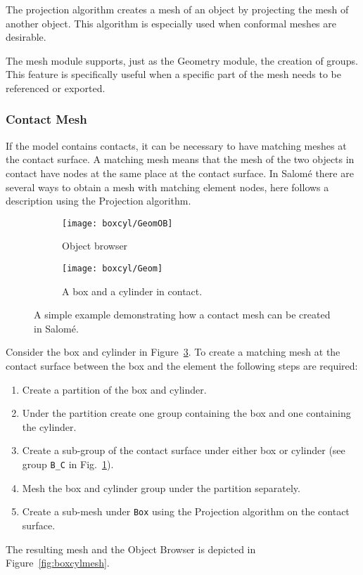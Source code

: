 The projection algorithm creates a mesh of an object by projecting the mesh of another object. This algorithm is especially used when conformal meshes are desirable.

The mesh module supports, just as the Geometry module, the creation of groups. This feature is specifically useful when a specific part of the mesh needs to be referenced or exported.

\subsubsection{Contact Mesh} %
\label{ssub:contact_mesh}
If the model contains contacts, it can be necessary to have matching meshes at the contact surface. A matching mesh means that the mesh of the two objects in contact have nodes at the same place at the contact surface. In Salomé there are several ways to obtain a mesh with matching element nodes, here follows a description using the Projection algorithm.

\begin{figure}[t]
	\begin{subfigure}{.35\textwidth}
		\begin{center}
			\texttt{[image: boxcyl/GeomOB]}
		\end{center}
		\caption{Object browser}
		\label{subfig:boxcylgeomob}
	\end{subfigure}
	\begin{subfigure}{.7\textwidth}
		\begin{center}
			\texttt{[image: boxcyl/Geom]}
		\end{center}
		\caption{A box and a cylinder in contact.}
		\label{subfig:boxcylgeom}
	\end{subfigure}
	\caption{A simple example demonstrating how a contact mesh can be created in Salomé.}
	\label{fig:boxcylgeom}
\end{figure}

Consider the box and cylinder in Figure~\ref{fig:boxcylgeom}. To create a matching mesh at the contact surface between the box and the element the following steps are required:
\begin{enumerate}
	\item Create a partition of the box and cylinder.
	\item Under the partition create one group containing the box and one containing the cylinder.
	\item Create a sub-group of the contact surface under either box or cylinder (see group \texttt{B\_C} in Fig.~\ref{subfig:boxcylgeomob}).
	\item Mesh the box and cylinder group under the partition separately.
	\item Create a sub-mesh under \texttt{Box} using the Projection algorithm on the contact surface.
\end{enumerate}
The resulting mesh and the Object Browser is depicted in Figure~\ref{fig:boxcylmesh}.


